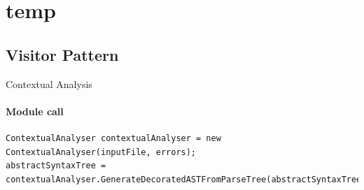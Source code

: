 \section{temp}
\subsection{Visitor Pattern}

\begin{frame}[fragile]{Contextual Analysis}
\framesubtitle{Module call}

    \begin{lstlisting}
ContextualAnalyser contextualAnalyser = new ContextualAnalyser(inputFile, errors);
abstractSyntaxTree = contextualAnalyser.GenerateDecoratedASTFromParseTree(abstractSyntaxTree);
    \end{lstlisting}


\end{frame}

